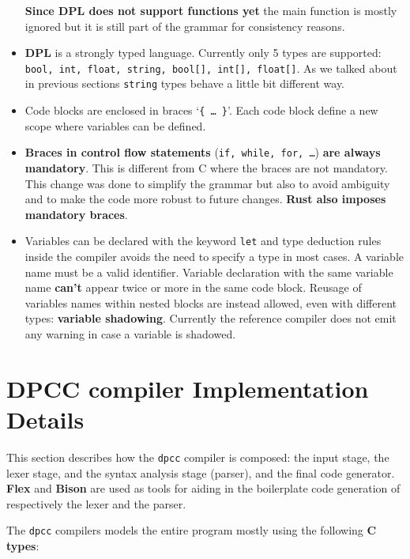 \documentclass[a4paper]{article}
\begin{document}
\begin{itemize}
    \textbf{Since DPL does not support functions yet} the main function is mostly ignored but it is still
    part of the grammar for consistency reasons.
    \item \textbf{DPL} is a strongly typed language. Currently only 5 types are supported: \texttt{bool, int, float, string, bool[], int[], float[]}.
    As we talked about in previous sections \texttt{string} types behave a little bit different way.


    \item Code blocks are enclosed in braces `\texttt{\{ \dots \ \}}'. Each code block define a new scope where variables can
        be defined.
    \item \textbf{Braces in control flow statements} (\texttt{if, while, for, \dots}) \textbf{are always mandatory}. This is different from C where the braces are not mandatory. This change was done to simplify the grammar but also to avoid ambiguity and to make the code more robust to future changes.
        \textbf{Rust also imposes mandatory braces}.

    \item Variables can be declared with the keyword \texttt{let} and type deduction rules inside the compiler avoids the need to specify a type in most cases. A variable name must be a valid identifier. Variable declaration with the same variable name \textbf{can't} appear twice or more in the same code block. Reusage of variables names within nested blocks are instead allowed, even with different types: \textbf{variable shadowing}. Currently the reference compiler does not emit any warning in case a variable is shadowed.

\end{itemize}

\clearpage
\section{DPCC compiler Implementation Details}

This section describes how the \texttt{dpcc} compiler is composed: the input stage, the lexer stage, and the syntax analysis stage (parser), and
the final code generator.
\textbf{Flex} and \textbf{Bison} are used as tools for aiding in the boilerplate code generation of respectively the lexer and the parser.


The \texttt{dpcc} compilers models the entire program mostly using the following \textbf{C types}:
\end{document}
